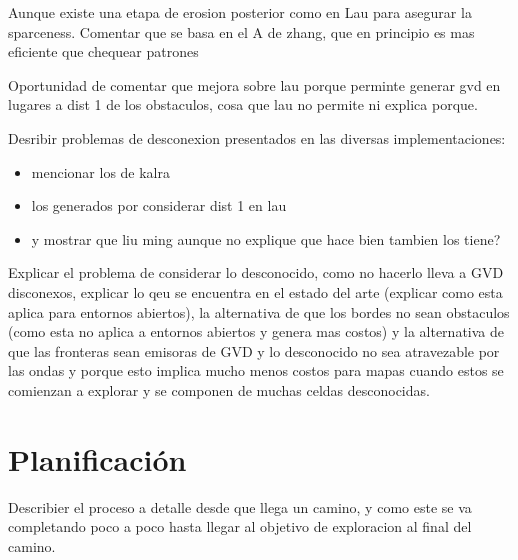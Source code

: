 Aunque existe una etapa de erosion posterior como en Lau para asegurar la sparceness. Comentar que se basa en el A de zhang, que en principio es mas eficiente que chequear patrones

Oportunidad de comentar que mejora sobre lau porque perminte generar gvd en
lugares a dist 1 de los obstaculos, cosa que lau no permite ni explica porque.

Desribir problemas de desconexion presentados en las diversas implementaciones: 
\begin{itemize}
  \item mencionar los de kalra
  \item los generados por considerar dist 1 en lau
  \item y mostrar que liu ming aunque no explique que hace bien tambien los tiene?
\end{itemize}

Explicar el problema de considerar lo desconocido, como no hacerlo lleva a GVD
disconexos, explicar lo qeu se encuentra en el estado del arte (explicar como
esta aplica para entornos abiertos), la alternativa de que los bordes no sean
obstaculos (como esta no aplica a entornos abiertos y genera mas costos) y la
alternativa de que las fronteras sean emisoras de GVD y lo desconocido no sea
atravezable por las ondas y porque esto implica mucho menos costos para mapas
cuando estos se comienzan a explorar y se componen de muchas celdas
desconocidas.






\section{Planificación}
Describier el proceso a detalle desde que llega un camino, y como este se va
completando poco a poco hasta llegar al objetivo de exploracion al final del
camino.

